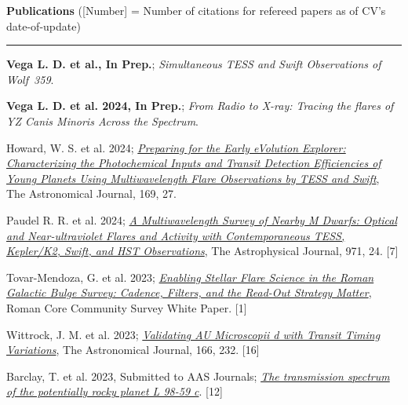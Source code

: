 \documentclass[12pt]{article}
\begin{document}
\noindent
{\bf Publications} ([Number] = Number of citations for refereed papers as of CV's date-of-update) \\
\vspace{-10mm}
\begin{center}
\rule{\textwidth}{0.2mm}
\end{center}
\vspace{-3mm}
\noindent
\begin{etaremune}
\renewcommand\labelenumi{\bfseries\theenumi .}
\item {\bf Vega L. D. et al., In Prep.}; {\it Simultaneous TESS and Swift Observations of Wolf~359}.

\item {\bf Vega L. D. et al. 2024, In Prep.}; {\it From Radio to X-ray: Tracing the flares of YZ Canis Minoris Across the Spectrum}.

\item {Howard, W. S. et al. 2024;}
\href{https://ui.adsabs.harvard.edu/abs/2025AJ....169...27H/abstract}{\it Preparing for the Early eVolution Explorer: Characterizing the Photochemical Inputs and Transit Detection Efficiencies of Young Planets Using Multiwavelength Flare Observations by TESS and Swift}, The Astronomical Journal, 169, 27.

\item {Paudel R. R. et al. 2024}; 
\href{https://ui.adsabs.harvard.edu/abs/2024ApJ...971...24P/abstract}{\it A Multiwavelength Survey of Nearby M Dwarfs: Optical and Near-ultraviolet Flares and Activity with Contemporaneous TESS, Kepler/K2, {\it Swift}, and HST Observations}, The Astrophysical Journal, 971, 24. [7]

\item {Tovar-Mendoza, G. et al. 2023};
\href{https://ui.adsabs.harvard.edu/abs/2023arXiv230705806T/abstract}{\it Enabling Stellar Flare Science in the Roman Galactic Bulge Survey: Cadence, Filters, and the Read-Out Strategy Matter}, Roman Core Community Survey White Paper. [1]

\item {Wittrock, J. M. et al. 2023};
\href{https://ui.adsabs.harvard.edu/abs/2023arXiv230204922W/abstract}{\it Validating AU Microscopii d with Transit Timing Variations}, The Astronomical Journal, 166, 232. [16]

\item {Barclay, T. et al. 2023, Submitted to AAS Journals}; \href{https://ui.adsabs.harvard.edu/abs/2023arXiv230110866B/abstract}{\it The transmission spectrum of the potentially rocky planet L 98-59 c}. [12]


\end{etaremune}
\end{document}
